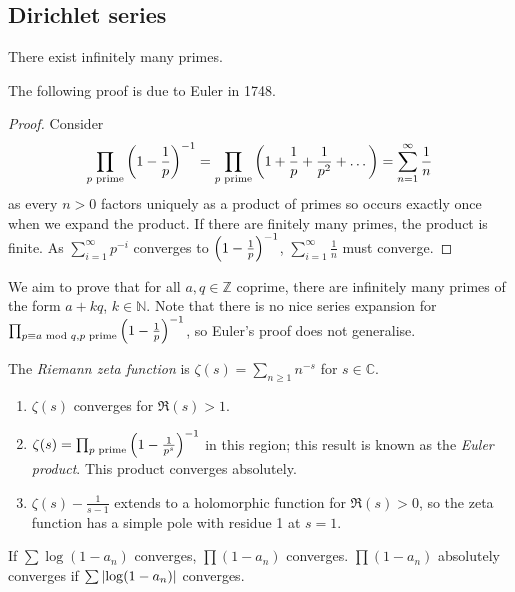 \subsection{Dirichlet series}
\begin{theorem}[Euclid]
    There exist infinitely many primes.
\end{theorem}
The following proof is due to Euler in 1748.
\begin{proof}
    Consider
    \[ \prod_{p \text{ prime}} \qty(1 - \frac{1}{p})^{-1} = \prod_{p \text{ prime}} \qty(1 + \frac{1}{p} + \frac{1}{p^2} + \dots) = \sum_{n=1}^\infty \frac{1}{n} \]
    as every \( n > 0 \) factors uniquely as a product of primes so occurs exactly once when we expand the product.
    If there are finitely many primes, the product is finite.
    As \( \sum_{i=1}^\infty p^{-i} \) converges to \( \qty(1 - \frac{1}{p})^{-1} \), \( \sum_{i=1}^\infty \frac{1}{n} \) must converge.
\end{proof}
We aim to prove that for all \( a, q \in \mathbb Z \) coprime, there are infinitely many primes of the form \( a + kq \), \( k \in \mathbb N \).
Note that there is no nice series expansion for \( \prod_{p \equiv a \text{ mod } q, p \text{ prime}} \qty(1 - \frac{1}{p})^{-1} \), so Euler's proof does not generalise.
\begin{definition}
    The \emph{Riemann zeta function} is \( \zeta(s) = \sum_{n \geq 1} n^{-s} \) for \( s \in \mathbb C \).
\end{definition}
\begin{proposition}
    \begin{enumerate}
        \item \( \zeta(s) \) converges for \( \Re(s) > 1 \).
        \item \( \zeta(s) = \prod_{p \text{ prime}} \qty(1 - \frac{1}{p^s})^{-1} \) in this region; this result is known as the \emph{Euler product}.
        This product converges absolutely.
        \item \( \zeta(s) - \frac{1}{s - 1} \) extends to a holomorphic function for \( \Re(s) > 0 \), so the zeta function has a simple pole with residue 1 at \( s = 1 \).
    \end{enumerate}
\end{proposition}
If \( \sum \log(1 - a_n) \) converges, \( \prod (1 - a_n) \) converges.
\( \prod (1 - a_n) \) absolutely converges if \( \sum \abs{\log(1-a_n)} \) converges.

